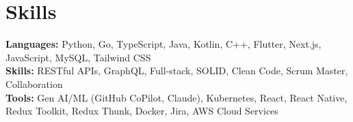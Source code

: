 \documentclass[11pt]{article}       %
\begin{document}
\vspace{-18.5pt}


\section*{Skills}
\textbf{Languages:} Python, Go, TypeScript, Java, Kotlin, C++, Flutter, Next.js, JavaScript, MySQL, Tailwind CSS\\
\textbf{Skills:} RESTful APIs, GraphQL, Full-stack, SOLID, Clean Code, Scrum Master, Collaboration\\
\textbf{Tools:} Gen AI/ML (GitHub CoPilot, Claude), Kubernetes, React, React Native, Redux Toolkit, Redux Thunk, Docker, Jira, AWS Cloud Services\\

\vspace{-6.5pt}
\end{document}
